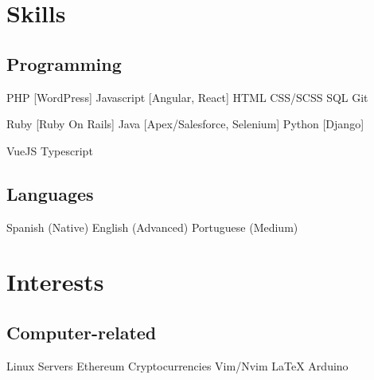 \documentclass[]{deedy-resume-openfont}
\begin{document}




\begin{minipage}[t]{0.33\textwidth} 


\section{Skills}
\subsection{Programming}
PHP [WordPress]\textbullet{} Javascript [Angular, React] \textbullet{} HTML \textbullet{} CSS/SCSS \textbullet{} SQL \textbullet{} Git
\sectionsep

Ruby [Ruby On Rails] \textbullet{} Java [Apex/Salesforce, Selenium] \textbullet{} Python [Django]
\sectionsep

VueJS \textbullet{} Typescript
\sectionsep

\subsection{Languages}
Spanish (Native) \textbullet{} English (Advanced) \textbullet{} Portuguese (Medium)
\sectionsep


\section{Interests}

\subsection{Computer-related}

Linux Servers \textbullet{} Ethereum \textbullet{} Cryptocurrencies \textbullet{} Vim/Nvim \textbullet{} \LaTeX \textbullet{} Arduino


\end{minipage}
\end{document}
